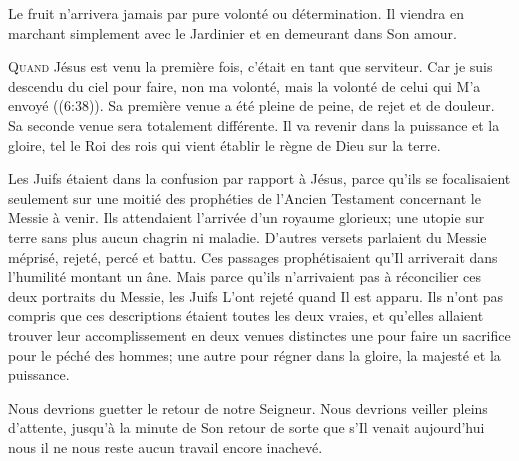 Le fruit n'arrivera jamais par pure volonté ou détermination.
 Il viendra en marchant simplement avec le Jardinier
 et en demeurant dans Son amour.

\dvrule







\lettrine{Q}{uand} Jésus est venu la première fois,
 c'était en tant que serviteur.
 \Og Car je suis descendu du ciel pour faire, non ma volonté,
 mais la volonté de celui qui M'a envoyé \Fg{} ((6:38)).
 Sa première venue a été pleine de peine, de rejet et de douleur.
 Sa seconde venue sera totalement différente.
 Il va revenir dans la puissance et la gloire, tel
 \Og le  Roi des rois \Fg{} 
 qui vient établir le règne de Dieu sur la terre.

Les Juifs étaient dans la confusion par rapport à Jésus,
 parce qu'ils se focalisaient seulement sur une moitié des prophéties
 de l'Ancien Testament concernant le Messie à venir.
 Ils attendaient l'arrivée d'un royaume glorieux;
 une utopie sur terre sans plus aucun chagrin ni maladie.
 D'autres versets parlaient du Messie méprisé, rejeté, percé et battu.
 Ces passages prophétisaient qu'Il arriverait dans l'humilité montant un âne.
 Mais parce qu'ils n'arrivaient pas à réconcilier ces deux portraits
 du Messie, les Juifs L'ont rejeté quand Il est apparu.
 Ils n'ont pas compris que ces descriptions étaient toutes les deux vraies,
 et qu'elles allaient trouver leur accomplissement en deux venues distinctes\frcolon{}
 une pour faire un sacrifice pour le péché des hommes;
 une autre pour régner dans la gloire, la majesté et la puissance.


Nous devrions guetter le retour de notre Seigneur.
 Nous devrions veiller pleins d'attente, jusqu'à la minute de Son retour
 \ocadr de sorte que s'Il venait aujourd'hui
 nous il ne nous reste aucun travail encore inachevé.

